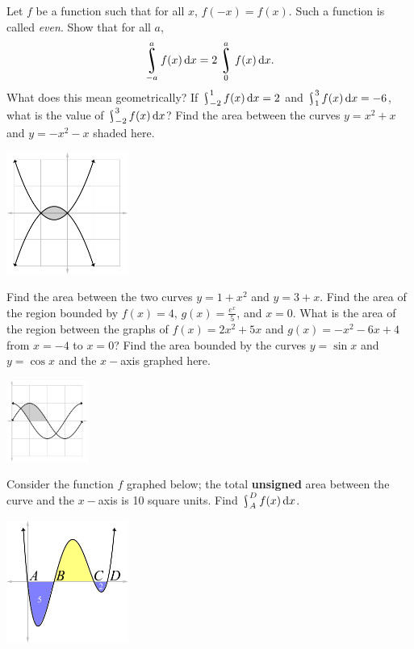 \begin{questions}
  \questioA Let $ f $ be a function such that for all $ x $, $ f(-x) = f(x) $. Such a function is called \textit{even}. Show that for all $ a $,
            \begin{displaymath}
              \rint^a_{-a} f(x) \dif{x} = 2\rint^a_0 f(x) \dif{x}.
            \end{displaymath}
            What does this mean geometrically?
  \questioM If $ \rint^1_{-2} f(x) \dif{x} = 2 $ and $ \rint^3_1 f(x) \dif{x} = -6 $, what is the value of $ \rint_{-2}^3 f(x) \dif{x} $?
  \clearpage
  \questioM Find the area between the curves $ y = x^2 + x $ and $ y = -x^2 - x $ shaded here.
            \begin{center}
              \includegraphics[width=0.3\textwidth]{int1}
            \end{center}
  \questioM Find the area between the two curves $ y = 1 + x^2 $ and $ y = 3 + x $.
  \questioM Find the area of the region bounded by $ f(x) = 4 $, $ g(x) = \frac{e^x}{5} $, and $ x = 0 $.
  \questioM What is the area of the region between the graphs of $ f(x) = 2x^2  + 5x $ and $ g(x) = -x^2 - 6x + 4 $ from $ x = -4 $ to $ x = 0 $?
  \questioE Find the area bounded by the curves $ y = \sin x $ and $ y = \cos x $ and the $ x-$axis graphed here.
            \begin{center}
              \includegraphics[width=0.2\textwidth]{int2}
            \end{center}
  \questioA Consider the function $ f $ graphed below; the total \textbf{unsigned} area between the curve and the $ x-$axis is 10 square units.
            Find $ \rint^D_A f(x) \dif{x} $.
            \begin{center}
              \includegraphics[width=0.3\textwidth]{int3}
            \end{center}
  \questioM
    \begin{parts}

\end{parts}
\end{questions}
